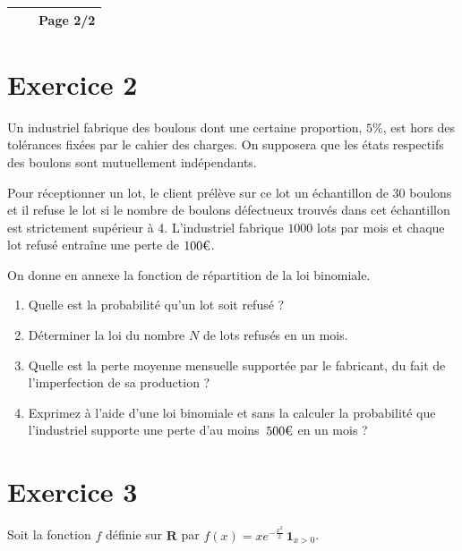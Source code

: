 \documentclass[10pt]{article}
\begin{document}
\newpage 

\begin{center}
    \renewcommand{\arraystretch}{1.5} 
    \begin{tabular}{|>{\centering\arraybackslash}m{4cm}|>{\centering\arraybackslash}m{6cm}|>{\centering\arraybackslash}m{4cm}|}
        \hline
            \hspace{4cm}&\hspace{6cm} & \textbf{Page 2/2}\\
            \hline
    \end{tabular}
\end{center}

\section*{Exercice 2}
Un industriel fabrique des boulons dont une certaine proportion, $5 \%$, est hors des tolérances fixées par le cahier des charges. 
On supposera que les états respectifs des boulons sont mutuellement indépendants.

Pour réceptionner un lot, le client prélève sur ce lot un échantillon de 30 boulons et il refuse le lot si le nombre de boulons défectueux trouvés dans cet échantillon est strictement supérieur à 4.\newline 
L'industriel fabrique $1000$ lots par mois et chaque lot refusé entraîne une perte de $100\text{\texteuro}$.


On donne en annexe la fonction de répartition de la loi binomiale.

\begin{enumerate}
    \item Quelle est la probabilité qu'un lot soit refusé ?
    \item Déterminer la loi du nombre $N$ de lots refusés en un mois.
    \item Quelle est la perte moyenne mensuelle supportée par le fabricant, du fait de l'imperfection de sa production ?
    \item Exprimez à l'aide d'une loi binomiale et sans la calculer la probabilité que l'industriel supporte une perte d'au moins~$500\text{\texteuro}$ en un mois ?
\end{enumerate}

\vspace{1em}
\section*{Exercice 3}
Soit la fonction $f$ définie sur $\mathbf{R}$ par $f(x)=x e^{-\frac{x^2}{2}}\, \mathbf{1}_{x>0}$.
\end{document}
